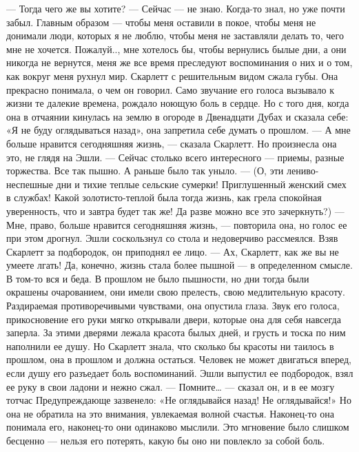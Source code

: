 — Тогда чего же вы хотите?
— Сейчас — не знаю. Когда-то знал, но уже почти забыл. Главным образом — чтобы меня оставили в покое, чтобы меня не донимали люди, которых я не люблю, чтобы меня не заставляли делать то, чего мне не хочется. Пожалуй.., мне хотелось бы, чтобы вернулись былые дни, а они никогда не вернутся, меня же все время преследуют воспоминания о них и о том, как вокруг меня рухнул мир.
Скарлетт с решительным видом сжала губы. Она прекрасно понимала, о чем он говорил. Само звучание его голоса вызывало к жизни те далекие времена, рождало ноющую боль в сердце. Но с того дня, когда она в отчаянии кинулась на землю в огороде в Двенадцати Дубах и сказала себе: «Я не буду оглядываться назад», она запретила себе думать о прошлом.
— А мне больше нравится сегодняшняя жизнь, — сказала Скарлетт. Но произнесла она это, не глядя на Эшли. — Сейчас столько всего интересного — приемы, разные торжества. Все так пышно. А раньше было так уныло. — (О, эти лениво-неспешные дни и тихие теплые сельские сумерки! Приглушенный женский смех в службах! Какой золотисто-теплой была тогда жизнь, как грела спокойная уверенность, что и завтра будет так же! Да разве можно все это зачеркнуть?) — Мне, право, больше нравится сегодняшняя жизнь, — повторила она, но голос ее при этом дрогнул.
Эшли соскользнул со стола и недоверчиво рассмеялся. Взяв Скарлетт за подбородок, он приподнял ее лицо.
— Ах, Скарлетт, как же вы не умеете лгать! Да, конечно, жизнь стала более пышной — в определенном смысле. В том-то вся и беда. В прошлом не было пышности, но дни тогда были окрашены очарованием, они имели свою прелесть, свою медлительную красоту.
Раздираемая противоречивыми чувствами, она опустила глаза. Звук его голоса, прикосновение его руки мягко открывали двери, которые она для себя навсегда заперла. За этими дверями лежала красота былых дней, и грусть и тоска по ним наполнили ее душу. Но Скарлетт знала, что сколько бы красоты ни таилось в прошлом, она в прошлом и должна остаться. Человек не может двигаться вперед, если душу его разъедает боль воспоминаний.
Эшли выпустил ее подбородок, взял ее руку в свои ладони и нежно сжал.
— Помните… — сказал он, и в ее мозгу тотчас Предупреждающе зазвенело: «Не оглядывайся назад! Не оглядывайся!» Но она не обратила на это внимания, увлекаемая волной счастья. Наконец-то она понимала его, наконец-то они одинаково мыслили. Это мгновение было слишком бесценно — нельзя его потерять, какую бы оно ни повлекло за собой боль.
